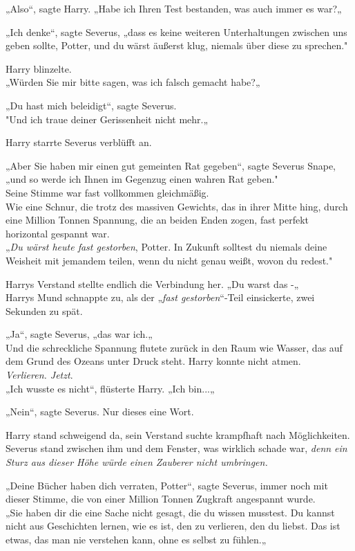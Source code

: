 {„Also“, sagte Harry. „Habe ich Ihren Test bestanden, was auch immer es war?„

„Ich denke“, sagte Severus, „dass es keine weiteren Unterhaltungen zwischen uns geben sollte, Potter, und du wärst äußerst klug, niemals über diese zu sprechen."

Harry blinzelte.\\ „Würden Sie mir bitte sagen, was ich falsch gemacht habe?„

„Du hast mich beleidigt“, sagte Severus.\\ "Und ich traue deiner Gerissenheit nicht mehr.„

Harry starrte Severus verblüfft an.

„Aber Sie haben mir einen gut gemeinten Rat gegeben“, sagte Severus Snape,\\ „und so werde ich Ihnen im Gegenzug einen wahren Rat geben."\\ Seine Stimme war fast vollkommen gleichmäßig.\\ Wie eine Schnur, die trotz des massiven Gewichts, das in ihrer Mitte hing, durch eine Million Tonnen Spannung, die an beiden Enden zogen, fast perfekt horizontal gespannt war.\\ „\emph{Du wärst heute fast gestorben}, Potter. In Zukunft solltest du niemals deine Weisheit mit jemandem teilen, wenn du nicht genau weißt, wovon du redest."

Harrys Verstand stellte endlich die Verbindung her. „Du warst das -„\\ Harrys Mund schnappte zu, als der „\emph{fast gestorben}“-Teil einsickerte, zwei Sekunden zu spät.

„Ja“, sagte Severus, „das war ich.„\\ Und die schreckliche Spannung flutete zurück in den Raum wie Wasser, das auf dem Grund des Ozeans unter Druck steht. Harry konnte nicht atmen.\\ \emph{Verlieren. Jetzt}.\\ „Ich wusste es nicht“, flüsterte Harry. „Ich bin...„

„Nein“, sagte Severus. Nur dieses eine Wort.

Harry stand schweigend da, sein Verstand suchte krampfhaft nach Möglichkeiten.\\ Severus stand zwischen ihm und dem Fenster, was wirklich schade war, \emph{denn ein Sturz aus dieser Höhe würde einen Zauberer nicht umbringen.}

„Deine Bücher haben dich verraten, Potter“, sagte Severus, immer noch mit dieser Stimme, die von einer Million Tonnen Zugkraft angespannt wurde.\\ „Sie haben dir die eine Sache nicht gesagt, die du wissen musstest. Du kannst nicht aus Geschichten lernen, wie es ist, den zu verlieren, den du liebst. Das ist etwas, das man nie verstehen kann, ohne es selbst zu fühlen.„

}
